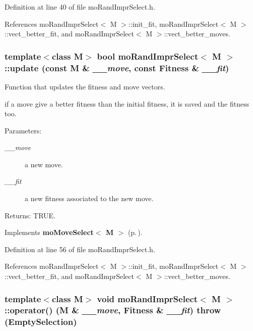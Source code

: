 Definition at line 40 of file mo\-Rand\-Impr\-Select.h.

References mo\-Rand\-Impr\-Select$<$ M $>$::init\_\-fit, mo\-Rand\-Impr\-Select$<$ M $>$::vect\_\-better\_\-fit, and mo\-Rand\-Impr\-Select$<$ M $>$::vect\_\-better\_\-moves.
\subsubsection{\setlength{\rightskip}{0pt plus 5cm}template$<$class M$>$ bool {\bf mo\-Rand\-Impr\-Select}$<$ M $>$::update (const M \& {\em \_\-\_\-move}, const {\bf Fitness} \& {\em \_\-\_\-fit})\hspace{0.3cm}{\tt  [inline, virtual]}}\label{classmo_rand_impr_select_60ae5548560caee7e28d5ed2446186c9}


Function that updates the fitness and move vectors. 

if a move give a better fitness than the initial fitness, it is saved and the fitness too.

\begin{Desc}
\item[Parameters:]
\begin{description}
\item[{\em \_\-\_\-move}]a new move. \item[{\em \_\-\_\-fit}]a new fitness associated to the new move. \end{description}
\end{Desc}
\begin{Desc}
\item[Returns:]TRUE. \end{Desc}


Implements {\bf mo\-Move\-Select$<$ M $>$} {\rm (p.\,\pageref{classmo_move_select_7c157b6e64fd417acf6e900059204eb1})}.

Definition at line 56 of file mo\-Rand\-Impr\-Select.h.

References mo\-Rand\-Impr\-Select$<$ M $>$::init\_\-fit, mo\-Rand\-Impr\-Select$<$ M $>$::vect\_\-better\_\-fit, and mo\-Rand\-Impr\-Select$<$ M $>$::vect\_\-better\_\-moves.
\subsubsection{\setlength{\rightskip}{0pt plus 5cm}template$<$class M$>$ void {\bf mo\-Rand\-Impr\-Select}$<$ M $>$::operator() (M \& {\em \_\-\_\-move}, {\bf Fitness} \& {\em \_\-\_\-fit})  throw ({\bf Empty\-Selection})\hspace{0.3cm}{\tt  [inline]}}\label{classmo_rand_impr_select_5ee57f77a450c0a9ce50bfccf3ad2a55}


